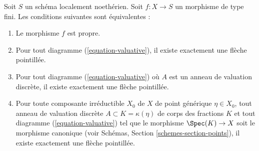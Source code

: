 \begin{lemma}
\label{lemma-Noetherian-dvr-valuative-proper}
Soit $S$ un schéma localement noethérien.
Soit $f : X \to S$ un morphisme de type fini.
Les conditions suivantes sont équivalentes :
\begin{enumerate}
\item Le morphisme $f$ est propre.
\item Pour tout diagramme (\ref{equation-valuative}), il existe exactement
une flèche pointillée.
\item Pour tout diagramme (\ref{equation-valuative}) où $A$ est un anneau
de valuation discrète, il existe exactement une flèche pointillée.
\item Pour toute composante irréductible $X_0$ de $X$ de
point générique $\eta \in X_0$, tout anneau de valuation discrète
$A \subset K = \kappa(\eta)$ de corps des fractions $K$ et tout
diagramme (\ref{equation-valuative}) tel que
le morphisme $\Spec(K) \to X$ soit le morphisme canonique
(voir
Schémas, Section \ref{schemes-section-points}),
il existe exactement une flèche pointillée.
\end{enumerate}
\end{lemma}

